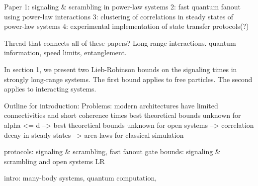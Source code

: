 Paper 1: signaling & scrambling in power-law systems
2: fast quantum fanout using power-law interactions
3: clustering of correlations in steady states of power-law systems
4: experimental implementation of state transfer protocols(?)

Thread that connects all of these papers? Long-range interactions. quantum information, speed limits, entanglement.

In section 1, we present two Lieb-Robinson bounds on the signaling times in strongly long-range systems. The first bound applies to free particles. The second applies to interacting systems.

Outline for introduction:
Problems: modern architectures have limited connectivities and short coherence times
best theoretical bounds unknown for alpha <= d -->
best theoretical bounds unknown for open systems --> correlation decay in steady states --> area-laws for classical simulation

protocols: signaling & scrambling, fast fanout gate
bounds: signaling & scrambling and open systems LR

intro: many-body systems, quantum computation, 
